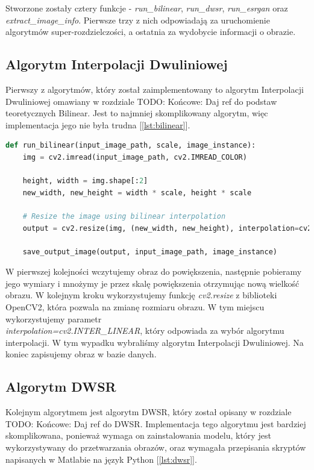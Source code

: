 Stworzone zostały cztery funkcje - \textit{run\_bilinear}, \textit{run\_dwsr}, \textit{run\_esrgan} oraz\\ \textit{extract\_image\_info}. Pierwsze trzy z nich odpowiadają za uruchomienie algorytmów super-rozdzielczości, a ostatnia za wydobycie informacji o obrazie.




\subsection*{Algorytm Interpolacji Dwuliniowej}

Pierwszy z algorytmów, który został zaimplementowany to algorytm Interpolacji Dwuliniowej omawiany w rozdziale
TODO: Końcowe: Daj ref do podstaw teoretycznych Bilinear.
Jest to najmniej skomplikowany algorytm, więc implementacja jego nie była trudna [\ref{lst:bilinear}].

\begin{lstlisting}[language=Python, caption=Implementacja algorytmu Bilinear., label={lst:bilinear}]
def run_bilinear(input_image_path, scale, image_instance):
    img = cv2.imread(input_image_path, cv2.IMREAD_COLOR)
    
    height, width = img.shape[:2]
    new_width, new_height = width * scale, height * scale

    # Resize the image using bilinear interpolation
    output = cv2.resize(img, (new_width, new_height), interpolation=cv2.INTER_LINEAR)

    save_output_image(output, input_image_path, image_instance)
\end{lstlisting}

W pierwszej kolejności wczytujemy obraz do powiększenia, następnie pobieramy jego wymiary i mnożymy je przez skalę powiększenia otrzymując nową wielkość obrazu. W kolejnym kroku wykorzystujemy funkcję \textit{cv2.resize} z biblioteki OpenCV2, która pozwala na zmianę rozmiaru obrazu. W tym miejscu wykorzystujemy parametr \\ \textit{interpolation=cv2.INTER\_LINEAR}, który odpowiada za wybór algorytmu interpolacji. W tym wypadku wybraliśmy algorytm Interpolacji Dwuliniowej. Na koniec zapisujemy obraz w bazie danych.


\subsection*{Algorytm DWSR}

Kolejnym algorytmem jest algorytm DWSR, który został opisany w rozdziale 
TODO: Końcowe: Daj ref do DWSR.
Implementacja tego algorytmu jest bardziej skomplikowana, ponieważ wymaga on zainstalowania modelu, który jest wykorzystywany do przetwarzania obrazów, oraz wymagała przepisania skryptów napisanych w Matlabie na język Python [\ref{lst:dwsr}].


